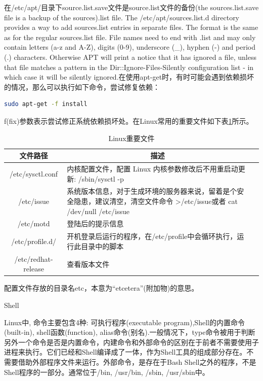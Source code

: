 \documentclass[12pt]{book}
\makeatletter
\numberwithin{dummy}{section}
\theoremstyle{ocrenumbox}
\theoremstyle{blacknumex}
\theoremstyle{blacknumbox}
\theoremstyle{ocrenum}
\renewcommand{\section}{\@startsection{section}{1}{\z@}
	{-4ex \@plus -1ex \@minus -.4ex}
	{1ex \@plus.2ex }
	{\normalfont\large\sffamily\bfseries}}
\makeatother
\begin{document}
在/etc/apt/目录下source.list.save文件是source.list文件的备份(the sources.list.save file is a backup of the sources).list file. The /etc/apt/sources.list.d directory provides a way to add sources.list entries in separate files. The format is the same as for the regular sources.list file. File names need to end with .list and may only contain letters (a-z and A-Z), digits (0-9), underscore (\_), hyphen (-) and period (.) characters. Otherwise APT will print a notice that it has ignored a file, unless that file matches a pattern in the Dir::Ignore-Files-Silently configuration list - in which case it will be silently ignored.在使用apt-get时，有时可能会遇到依赖损坏的情况，那么可以执行如下命令，尝试修复依赖：

\begin{lstlisting}[language=Bash]
sudo apt-get -f install 
\end{lstlisting}

f(fix)参数表示尝试修正系统依赖损坏处。在Linux常用的重要文件如下表\ref{table:linuxconfigfile}所示。


\begin{table}
	\caption{Linux重要文件}
	\label{table:linuxconfigfile}
	\begin{center}
		\begin{tabular}{cp{10cm}c}
			\hline
			\multirow{1}{*}{文件路径}
			& \multicolumn{1}{c}{描述}  \\
			\hline			
			/etc/sysctl.conf  & 内核配置文件，配置 Linux 内核参数修改后不用重启动更新: /sbin/sysctl -p \\
			/etc/issue  & 系统版本信息，对于生成环境的服务器来说，留着是个安全隐患，建议清空，清空文件命令 >/etc/issue或者 cat /dev/null /etc/issue \\
			/etc/motd & 登陆后的提示信息\\
			/etc/profile.d/ & 开机登录后运行的程序，在/etc/profile中会循环执行，运行此目录中的脚本\\
			/etc/redhat-release & 查看版本文件\\
			\hline
		\end{tabular}	
	\end{center}
\end{table}

配置文件存放的目录名etc，本意为“etcetera”(附加物)的意思。

\section{Shell}

Linux中, 命令主要包含4种: 可执行程序(executable program),Shell的内置命令(built-in), shell函数(function), alias命令(别名).一般情况下，type命令被用于判断另外一个命令是否是内置命令，内建命令和外部命令的区别在于前者不需要使用子进程来执行。它们已经和Shell编译成了一体，作为Shell工具的组成部分存在。不需要借助外部程序文件来运行。外部命令，是存在于Bash Shell之外的程序，不是Shell程序的一部分。通常位于/bin, /usr/bin, /sbin, /usr/sbin中。
\end{document}
